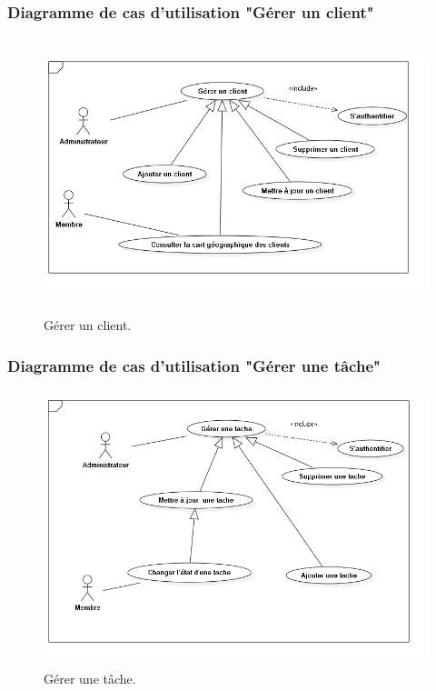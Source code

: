 \subsubsection{ Diagramme de cas d'utilisation "G\'{e}rer un client"}
\begin{figure}[H]
\center
\includegraphics[width=13cm,height=8cm]{./figures/ucC.png}
\caption{G\'{e}rer un client.}
\end{figure}

\subsubsection{ Diagramme de cas d'utilisation "G\'{e}rer une t\^{a}che"}
\begin{figure}[H]
\center
\includegraphics[width=13cm,height=8cm]{./figures/ucT.png}
\caption{G\'{e}rer une t\^{a}che.}

\end{figure}




